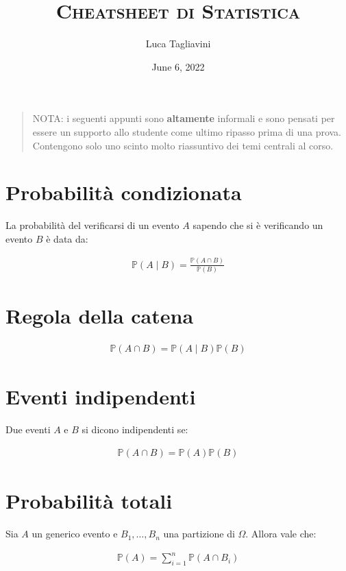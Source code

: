 \documentclass{article}
\title{\textsc{Cheatsheet di Statistica}}
\author{Luca Tagliavini}
\date{June 6, 2022}
\begin{document}
\maketitle

\begin{quote}
NOTA: i seguenti appunti sono \textbf{altamente} informali e sono pensati per essere
un supporto allo studente come ultimo ripasso prima di una prova. Contengono solo
uno scinto molto riassuntivo dei temi centrali al corso.
\end{quote}

\section{Probabilit\`a condizionata}

La probabilit\`a del verificarsi di un evento $A$ sapendo che si \`e verificando un evento $B$ \`e data da:

\begin{align*}
\mathbb{P}(A \mid B) = \frac{\mathbb{P}(A \cap B)}{\mathbb{P}(B)}
\end{align*}

\section{Regola della catena}

\begin{align*}
\mathbb{P}(A \cap B) = \mathbb{P}(A \mid B) \mathbb{P}(B)
\end{align*}

\section{Eventi indipendenti}

Due eventi $A$ e $B$ si dicono indipendenti se:

\begin{align*}
\mathbb{P}(A \cap B) = \mathbb{P}(A)\mathbb{P}(B)
\end{align*}

\section{Probabilit\`a totali}

Sia $A$ un generico evento e $B_1,\ldots,B_n$ una partizione di $\Omega$. Allora vale che:

\begin{align*}
\mathbb{P}(A) = \sum_{i=1}^n \mathbb{P}(A \cap B_i)
\end{align*}
\end{document}
